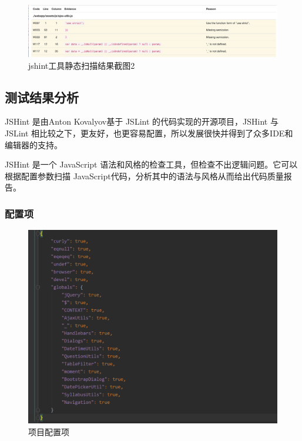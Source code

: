 \documentclass[hyperref, a4paper]{ctexart}
\begin{document}
\begin{figure}
\centering
\includegraphics{screenshots/pic3.jpg}
\caption{jshint工具静态扫描结果截图2}
\end{figure}

\hypertarget{ux6d4bux8bd5ux7ed3ux679cux5206ux6790-2}{%
\subsection{测试结果分析}\label{ux6d4bux8bd5ux7ed3ux679cux5206ux6790-2}}

JSHint 是由Anton Kovalyov基于 JSLint 的代码实现的开源项目，JSHint 与
JSLint
相比较之下，更友好，也更容易配置，所以发展很快并得到了众多IDE和编辑器的支持。

JSHint 是一个 JavaScript
语法和风格的检查工具，但检查不出逻辑问题。它可以根据配置参数扫描
JavaScript代码，分析其中的语法与风格从而给出代码质量报告。

\hypertarget{ux914dux7f6eux9879}{%
\subsubsection{配置项}\label{ux914dux7f6eux9879}}

\begin{figure}
\centering
\includegraphics{screenshots/jshintrc.png}
\caption{项目配置项}
\end{figure}
\end{document}
